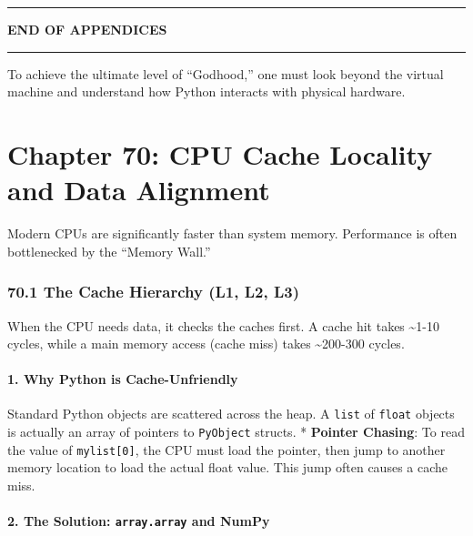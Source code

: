 \begin{center}\rule{0.5\linewidth}{0.5pt}\end{center}

\textbf{END OF APPENDICES}

\begin{center}\rule{0.5\linewidth}{0.5pt}\end{center}

To achieve the ultimate level of ``Godhood,'' one must look beyond the
virtual machine and understand how Python interacts with physical
hardware.

\hypertarget{chapter-70-cpu-cache-locality-and-data-alignment}{%
\chapter{Chapter 70: CPU Cache Locality and Data
Alignment}\label{chapter-70-cpu-cache-locality-and-data-alignment}}

Modern CPUs are significantly faster than system memory. Performance is
often bottlenecked by the ``Memory Wall.''

\hypertarget{the-cache-hierarchy-l1-l2-l3}{%
\subsection{70.1 The Cache Hierarchy (L1, L2,
L3)}\label{the-cache-hierarchy-l1-l2-l3}}

When the CPU needs data, it checks the caches first. A cache hit takes
\textasciitilde1-10 cycles, while a main memory access (cache miss)
takes \textasciitilde200-300 cycles.

\hypertarget{why-python-is-cache-unfriendly}{%
\subsubsection{1. Why Python is
Cache-Unfriendly}\label{why-python-is-cache-unfriendly}}

Standard Python objects are scattered across the heap. A
\passthrough{\lstinline!list!} of \passthrough{\lstinline!float!}
objects is actually an array of pointers to
\passthrough{\lstinline!PyObject!} structs. * \textbf{Pointer Chasing}:
To read the value of \passthrough{\lstinline!mylist[0]!}, the CPU must
load the pointer, then jump to another memory location to load the
actual float value. This jump often causes a cache miss.

\hypertarget{the-solution-array.array-and-numpy}{%
\subsubsection{\texorpdfstring{2. The Solution: \texttt{array.array} and
NumPy}{2. The Solution: array.array and NumPy}}\label{the-solution-array.array-and-numpy}}

